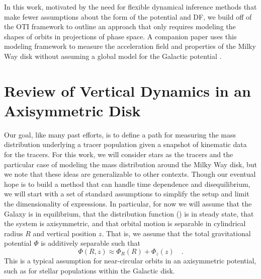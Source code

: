 \documentclass[modern]{aastex631}
\begin{document}
In this work, motivated by the need for flexible dynamical inference methods that make
fewer assumptions about the form of the potential and DF, we build off of the OTI
framework to outline an approach that only requires modeling the shapes of orbits in
projections of phase space.
A companion paper uses this modeling framework to measure the acceleration field and
properties of the Milky Way disk without assuming a global model for the Galactic
potential \citep{Horta:2023}.


\section{Review of Vertical Dynamics in an Axisymmetric Disk} \label{sec:dynreview}

Our goal, like many past efforts, is to define a path for measuring the mass
distribution underlying a tracer population given a snapshot of kinematic data for the
tracers.
For this work, we will consider stars as the tracers and the particular case of modeling
the mass distribution around the Milky Way disk, but we note that these ideas are
generalizable to other contexts.
Though our eventual hope is to build a method that can handle time dependence and
disequilibrium, we will start with a set of standard assumptions to simplify the setup
and limit the dimensionality of expressions.
In particular, for now we will assume that the Galaxy is in equilibrium, that the
distribution function (\df) is in steady state, that the system is axisymmetric, and
that orbital motion is separable in cylindrical radius $R$ and vertical position $z$.
That is, we assume that the total gravitational potential $\Phi$ is additively separable
such that
\begin{equation}
    \Phi(R, z) \approx \Phi_R(R) + \Phi_z(z) \quad .
\end{equation}
This is a typical assumption for near-circular orbits in an axisymmetric potential, such
as for stellar populations within the Galactic disk.
\end{document}
